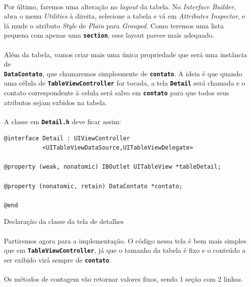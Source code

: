 \documentclass[a4paper,12pt,brazil,doubleside]{book}
\begin{document}
\begin{singlespace}
\paragraph{}Por último, faremos uma alteração no \emph{layout} da tabela. No \emph{Interface Builder}, abra o menu \emph{Utilities} à direita, selecione a tabela e vá em \emph{Attributes Inspector}, e lá mude o atributo \emph{Style} de \emph{Plain} para \emph{Grouped}. Como teremos uma lista pequena com apenas uma \texttt{\textbf{section}}, esse layout parece mais adequado.
\paragraph{}Além da tabela, vamos criar mais uma única propriedade que será uma instância de\\
\texttt{\textbf{DataContato}}, que chamaremos simplesmente de \texttt{\textbf{contato}}. A ideia é que quando uma célula de \texttt{\textbf{TableViewController}} for tocada, a tela \texttt{\textbf{Detail}} será chamada e o contato correspondente à celula será salvo em \texttt{\textbf{contato}} para que todos seus atributos sejam exbidos na tabela.
\paragraph{}A classe em \texttt{\textbf{Detail.h}} deve ficar assim:

\begin{listing}[H]
\begin{verbatim}
@interface Detail : UIViewController
           <UITableViewDataSource,UITableViewDelegate>

@property (weak, nonatomic) IBOutlet UITableView *tableDetail;

@property (nonatomic, retain) DataContato *contato;

@end
\end{verbatim}
\caption{Declaração da classe da tela de detalhes}
\end{listing}

\paragraph{}Partiremos agora para a implementação. O código nessa tela é bem mais simples que em \texttt{\textbf{TableViewController}}, já que o tamanho da tabela é fixo e o conteúdo a ser exibido virá sempre de \texttt{\textbf{contato}}.
\paragraph{}Os métodos de contagem vão retornar valores fixos, sendo 1 seção com 2 linhas.


\end{singlespace}
\end{document}
